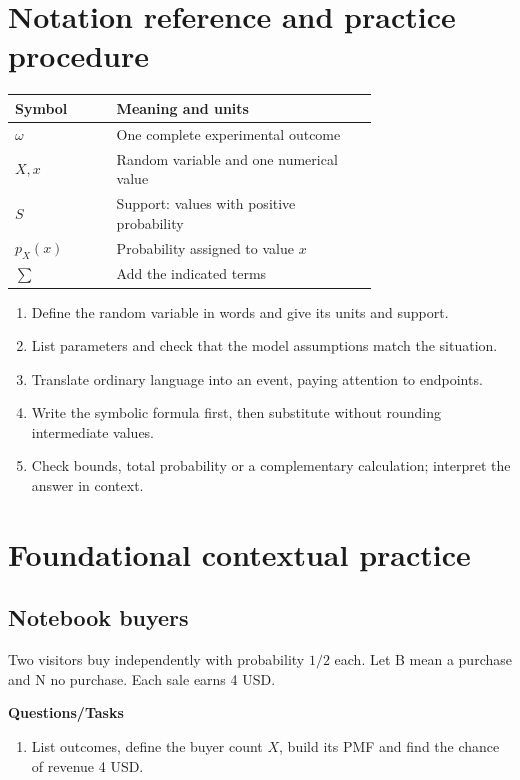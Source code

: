 \section{Notation reference and practice procedure}
\begin{center}
\begin{tabular}{lp{0.72\linewidth}}
\toprule
Symbol & Meaning and units \\ \midrule
$\omega$ & One complete experimental outcome \\
$X,x$ & Random variable and one numerical value \\
$S$ & Support: values with positive probability \\
$p_X(x)$ & Probability assigned to value $x$ \\
$\sum$ & Add the indicated terms \\
\bottomrule
\end{tabular}
\end{center}
\begin{enumerate}
\item Define the random variable in words and give its units and support.
\item List parameters and check that the model assumptions match the situation.
\item Translate ordinary language into an event, paying attention to endpoints.
\item Write the symbolic formula first, then substitute without rounding intermediate values.
\item Check bounds, total probability or a complementary calculation; interpret the answer in context.
\end{enumerate}
\section{Foundational contextual practice}\label{sec:t2-c1-foundational}
\subsection{Notebook buyers}
Two visitors buy independently with probability $1/2$ each. Let B mean a purchase and N no purchase. Each sale earns 4 USD.

\textbf{Questions/Tasks}
\begin{enumerate}
\item List outcomes, define the buyer count $X$, build its PMF and find the chance of revenue 4 USD.
\end{enumerate}
